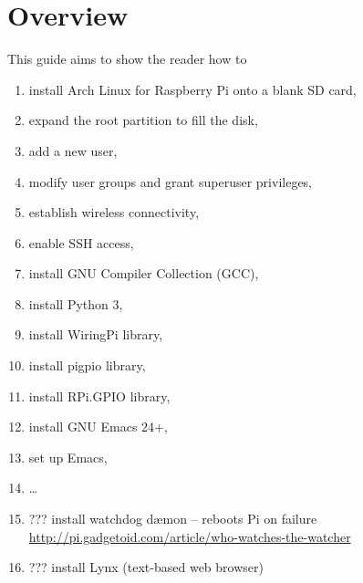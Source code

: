 \documentclass[12pt,letterpaper]{article}
\begin{document}
\section{Overview}
This guide aims to show the reader how to
\begin{enumerate}
\item install Arch Linux for Raspberry Pi onto a blank SD card,
\item expand the root partition to fill the disk,
\item add a new user,
\item modify user groups and grant superuser privileges,
\item establish wireless connectivity,
\item enable SSH access,
\item install GNU Compiler Collection (GCC), %
\item install Python 3,
\item install WiringPi library,
\item install pigpio library,
\item install RPi.GPIO library,
\item install GNU Emacs 24+,
\item set up Emacs,
\item \ldots
\item ??? install watchdog d\ae mon -- reboots Pi on failure \url{http://pi.gadgetoid.com/article/who-watches-the-watcher}
\item ??? install Lynx (text-based web browser)
\end{enumerate}
\end{document}
